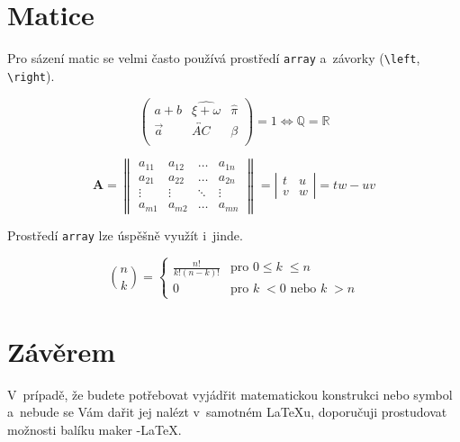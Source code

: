 \documentclass[a4paper,11pt,twocolumn]{article}
\theoremstyle{definition}
\begin{document}
\section{Matice}
Pro sázení matic se velmi často používá prostředí \texttt{array} a~závorky (\verb|\left|, \verb|\right|).

$$
	\left(
	\begin{array}{ccc}
	a + b & \widehat{\xi + \omega} & \hat{\pi} \\
	\vec a & \overleftrightarrow{AC} & \beta \\
	\end{array}
	\right)
	= 1 \Longleftrightarrow \mathbb{Q = R} 
$$

$$
		\mathbf{A} =
		\left\|
		\begin{array}{cccc}
			a_{11} & a_{12} & \ldots & a_{1n} \\
			a_{21} & a_{22} & \ldots & a_{2n} \\
			\vdots & \vdots & \ddots & \vdots \\
			a_{m1} & a_{m2} & \ldots & a_{mn}
		\end{array}
		\right\|
		= \left|
		\begin{array}{cc}
			t & u \\
			v & w
		\end{array}
		\right|
		= tw - uv
$$

\quad Prostředí \texttt{array} lze úspěšně využít i~jinde.

$$
	\binom{n}{k} =
	\left\{
	\begin{array}{ll}
	\frac{n!}{k!(n - k)!} & \text{pro } 0 \leq k\;\leq n \\
	0 & \text{pro } k\;< 0 \text{ nebo } k\;> n
	\end{array}
	\right.
$$
\section{Závěrem}
V~prípadě, že budete potřebovat vyjádřit matematickou
konstrukci nebo symbol a~nebude se Vám dařit jej nalézt
v~samotném \LaTeX u, doporučuji prostudovat možnosti balíku
maker \AmS-\LaTeX.
\end{document}
